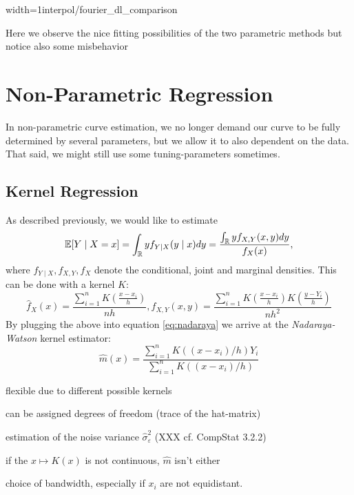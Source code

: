 \begin{my_figure}[h]{width=1\textwidth}{interpol/fourier_dl_comparison}
	\caption{Here we observe the nice fitting possibilities of the two parametric methods but notice also some misbehavior}
	\label{fig:interpol/fourier_dl_comparison}
\end{my_figure}



\section{Non-Parametric Regression}
In non-parametric curve estimation, we no longer demand our curve to be fully determined by several parameters, but we allow it to also dependent on the data. That said, we might still use some tuning-parameters sometimes.
\subsection{Kernel Regression}
\label{sec:Kernel}
As described previously, we would like to estimate
\begin{equation}
	\label{eq:nadaraya}
	\mathbb{E}[Y \mid X=x]
	= \int_{\mathbb{R}} y f_{Y \mid X}(y \mid x) d y
	=\frac{\int_{\mathbb{R}} y f_{X, Y}(x, y) d y}{f_{X}(x)},
\end{equation}
where $f_{Y \mid X}, f_{X, Y}, f_{X}$ denote the conditional, joint and marginal densities.
This can be done with a kernel $K$:
$$
	\hat{f}_{X}(x)=\frac{\sum_{i=1}^{n} K\left(\frac{x-x_{i}}{h}\right)}{n h}, \hat{f}_{X, Y}(x, y)=\frac{\sum_{i=1}^{n} K\left(\frac{x-x_{i}}{h}\right) K\left(\frac{y-Y_{i}}{h}\right)}{n h^{2}}
$$
By plugging the above into equation \ref{eq:nadaraya} we arrive at the \textit{Nadaraya-Watson} kernel estimator:
$$\hat{m}(x)=\frac{\sum_{i=1}^{n} K\left(\left(x-x_{i}\right) / h\right) Y_{i}}{\sum_{i=1}^{n} K\left(\left(x-x_{i}\right) / h\right)}$$


\begin{my_pros_cons_table}{
		\item flexible due to different possible kernels
		\item can be assigned degrees of freedom (trace of the hat-matrix)
		\item estimation of the noise variance $\hat \sigma_\varepsilon^2$ (XXX cf. CompStat 3.2.2)
	}{
		\item if the $x \mapsto K(x)$ is not continuous, $\hat m $ isn't either
		\item choice of bandwidth, especially if $x_i$ are not equidistant.
	}
\end{my_pros_cons_table}


